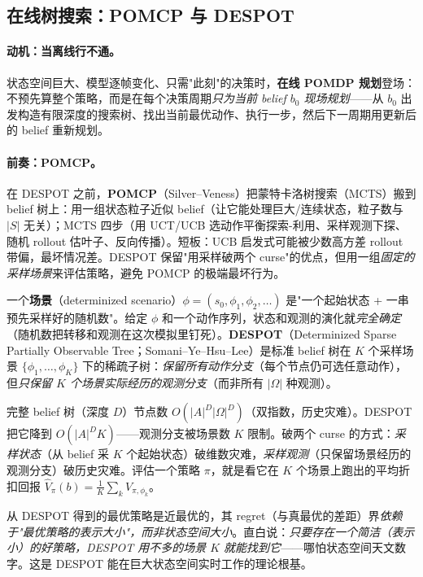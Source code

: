 \subsection{在线树搜索：POMCP 与 DESPOT}
\label{sec:pomdp-despot}

\paragraph{动机：当离线行不通。}
状态空间巨大、模型逐帧变化、只需"此刻"的决策时，\textbf{在线 POMDP 规划}登场：不预先算整个策略，而是在每个决策周期\emph{只为当前 belief $b_0$ 现场规划}——从 $b_0$ 出发构造有限深度的搜索树、找出当前最优动作、执行一步，然后下一周期用更新后的 belief 重新规划。

\paragraph{前奏：POMCP。}
在 DESPOT 之前，\textbf{POMCP}（Silver--Veness\cite{silver2010pomcp}）把蒙特卡洛树搜索（MCTS）搬到 belief 树上：用一组状态粒子近似 belief（让它能处理巨大/连续状态，粒子数与 $|S|$ 无关）；MCTS 四步（用 UCT/UCB 选动作平衡探索-利用、采样观测下探、随机 rollout 估叶子、反向传播）。短板：UCB 启发式可能被少数高方差 rollout 带偏，最坏情况差。DESPOT 保留"用采样破两个 curse"的优点，但用一组\emph{固定的采样场景}来评估策略，避免 POMCP 的极端最坏行为。

\begin{definition}\label{def:pomdp-despot}
一个\textbf{场景}（determinized scenario）$\phi=(s_0,\phi_1,\phi_2,\dots)$ 是"一个起始状态 + 一串预先采样好的随机数"。给定 $\phi$ 和一个动作序列，状态和观测的演化就\emph{完全确定}（随机数把转移和观测在这次模拟里钉死）。\textbf{DESPOT}（Determinized Sparse Partially Observable Tree；Somani--Ye--Hsu--Lee\cite{somani2013despot}）是标准 belief 树在 $K$ 个采样场景 $\{\phi_1,\dots,\phi_K\}$ 下的稀疏子树：\emph{保留所有动作分支}（每个节点仍可选任意动作），但\emph{只保留 $K$ 个场景实际经历的观测分支}（而非所有 $|\Omega|$ 种观测）。
\end{definition}

完整 belief 树（深度 $D$）节点数 $O(|A|^D|\Omega|^D)$（双指数，历史灾难）。DESPOT 把它降到 $O(|A|^D K)$——观测分支被场景数 $K$ 限制。破两个 curse 的方式：\emph{采样状态}（从 belief 采 $K$ 个起始状态）破维数灾难，\emph{采样观测}（只保留场景经历的观测分支）破历史灾难。评估一个策略 $\pi$，就是看它在 $K$ 个场景上跑出的平均折扣回报 $\hat V_\pi(b)=\frac1K\sum_k V_{\pi,\phi_k}$。

\begin{theorem}\label{thm:pomdp-output}
从 DESPOT 得到的最优策略是近最优的，其 regret（与真最优的差距）界\emph{依赖于"最优策略的表示大小"，而非状态空间大小}\cite{somani2013despot}。直白说：\emph{只要存在一个简洁（表示小）的好策略，DESPOT 用不多的场景 $K$ 就能找到它}——哪怕状态空间天文数字。这是 DESPOT 能在巨大状态空间实时工作的理论根基。
\end{theorem}


